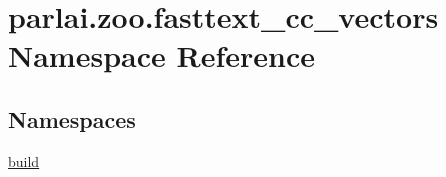 \hypertarget{namespaceparlai_1_1zoo_1_1fasttext__cc__vectors}{}\section{parlai.\+zoo.\+fasttext\+\_\+cc\+\_\+vectors Namespace Reference}
\label{namespaceparlai_1_1zoo_1_1fasttext__cc__vectors}
\subsection*{Namespaces}
\begin{DoxyCompactItemize}
\item 
 \hyperlink{namespaceparlai_1_1zoo_1_1fasttext__cc__vectors_1_1build}{build}
\end{DoxyCompactItemize}
